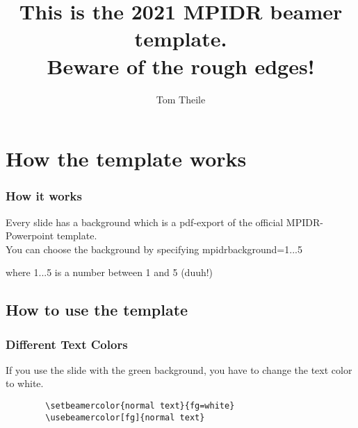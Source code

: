 \documentclass[aspectratio=169]{beamer}
\begin{document}
\title[beamer manual]										%
{This is the 2021 MPIDR beamer template. \\ Beware of the rough edges! }

\author[Theile]{Tom Theile}



\begin{frame}[mpidrbackground=1]
  \titlepage
\end{frame}

\section{How the template works}

\begin{frame}[mpidrbackground=2]
  \tableofcontents
\end{frame}


\begin{frame}[mpidrbackground=2]
    \frametitle{How it works}
  Every slide has a background which is a pdf-export of the official MPIDR-Powerpoint template.\\
  
  You can choose the background by specifying  mpidrbackground={1...5}
  
  where {1...5} is a number between 1 and 5 (duuh!)
  
\end{frame} 


\subsection{How to use the template}


\begin{frame}[mpidrbackground=1, fragile,label=notleM2bis] %
    \frametitle{Different Text Colors}
    
    If you use the slide with the green background, you have to change the text color to white.
    \begin{verbatim}
        \setbeamercolor{normal text}{fg=white}
        \usebeamercolor[fg]{normal text}
    \end{verbatim}
    
\end{frame}
\end{document}
